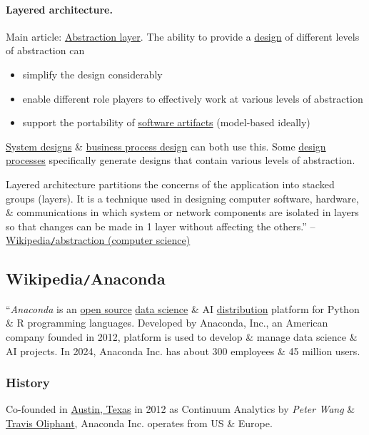 \documentclass{article}
\begin{document}
\paragraph{Layered architecture.} Main article: \href{https://en.wikipedia.org/wiki/Abstraction_layer}{Abstraction layer}. The ability to provide a \href{https://en.wikipedia.org/wiki/Design}{design} of different levels of abstraction can
\begin{itemize}
	\item simplify the design considerably
	\item enable different role players to effectively work at various levels of abstraction
	\item support the portability of \href{https://en.wikipedia.org/wiki/Software_artifact}{software artifacts} (model-based ideally)
\end{itemize}
\href{https://en.wikipedia.org/wiki/Systems_design}{System designs} \& \href{https://en.wikipedia.org/wiki/Business_process_modeling}{business process design} can both use this. Some \href{https://en.wikipedia.org/wiki/Software_modeling}{design processes} specifically generate designs that contain various levels of abstraction.

Layered architecture partitions the concerns of the application into stacked groups (layers). It is a technique used in designing computer software, hardware, \& communications in which system or network components are isolated in layers so that changes can be made in 1 layer without affecting the others.'' -- \href{https://en.wikipedia.org/wiki/Abstraction_(computer_science)}{Wikipedia{\tt/}abstraction (computer science)}


\subsection{Wikipedia{\tt/}Anaconda}
``{\it Anaconda} is an \href{https://en.wikipedia.org/wiki/Open_source}{open source} \href{https://en.wikipedia.org/wiki/Data_science}{data science} \& AI \href{https://en.wikipedia.org/wiki/Software_distribution}{distribution} platform for Python \& R programming languages. Developed by Anaconda, Inc., an American company founded in 2012, platform is used to develop \& manage data science \& AI projects. In 2024, Anaconda Inc. has about 300 employees \& 45 million users.

\subsubsection{History}
Co-founded in \href{https://en.wikipedia.org/wiki/Austin,_Texas}{Austin, Texas} in 2012 as Continuum Analytics by {\it Peter Wang} \& \href{https://en.wikipedia.org/wiki/Travis_Oliphant}{\sc Travis Oliphant}, Anaconda Inc. operates from US \& Europe.
\end{document}
